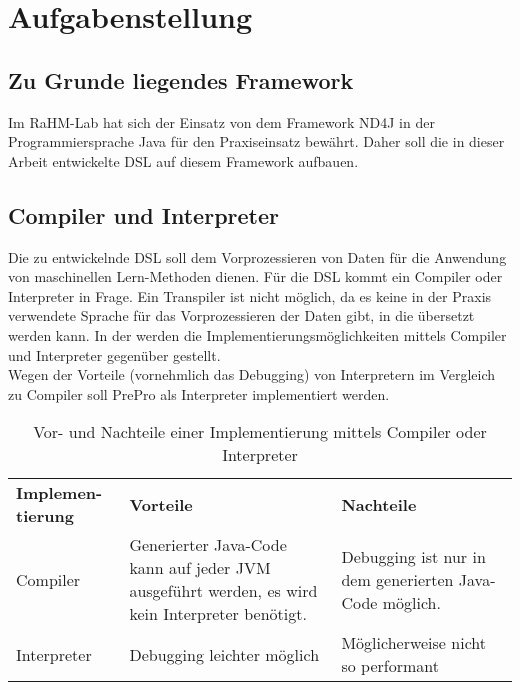 \chapter{Aufgabenstellung}
\section{Zu Grunde liegendes Framework}
Im RaHM-Lab hat sich der Einsatz von dem Framework ND4J in der Programmiersprache Java für den Praxiseinsatz bewährt.
Daher soll die in dieser Arbeit entwickelte \ac{DSL} auf diesem Framework aufbauen.

\section{Compiler und Interpreter}
Die zu entwickelnde DSL soll dem Vorprozessieren von Daten für die Anwendung von maschinellen Lern-Methoden dienen.
Für die \ac{DSL} kommt ein Compiler oder Interpreter in Frage.
Ein Transpiler ist nicht möglich, da es keine in der Praxis verwendete Sprache für das Vorprozessieren der Daten gibt, in die übersetzt werden kann.
In der  werden die Implementierungsmöglichkeiten mittels Compiler und Interpreter gegenüber gestellt.\\
Wegen der Vorteile (vornehmlich das Debugging) von Interpretern im Vergleich zu Compiler soll PrePro als Interpreter implementiert werden.

\begin{table}[H]
	\centering
	\begin{tabular}{ | p{3cm} | p{6cm} | p{6cm} | }
		\hline \rowcolor{gray!15}
		\textbf{Implemen-tierung} & \textbf{Vorteile} & \textbf{Nachteile} \\ \hhline{|=|=|=|}
		Compiler & Generierter Java-Code kann auf jeder \ac{JVM} ausgeführt werden, es wird kein Interpreter benötigt. & Debugging ist nur in dem generierten Java-Code möglich. \\ \hline
		Interpreter & Debugging leichter möglich & Möglicherweise nicht so performant \\ \hline
	\end{tabular}
	\caption{Vor- und Nachteile einer Implementierung mittels Compiler oder Interpreter}
	\label{tab:Vorteile_Compiler_Interpreter}
\end{table}

\label{sec:usedTechnologies}
